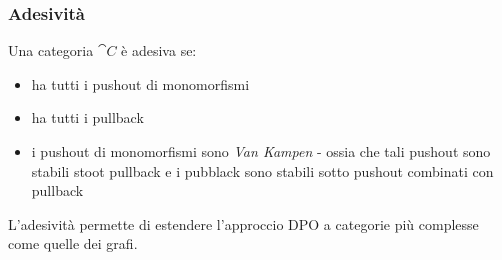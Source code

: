 \documentclass[8pt]{beamer}
\begin{document}
\begin{frame}[fragile]\frametitle{Adesività}


	\iffalse
	\begin{wrapfigure}{l}{0.4\textwidth}
                \[
                \begin{tikzcd}[row sep=11, column sep=11]
                        & {A'} && {B'} \\
                        {C'} && {D'} \\
                        & A && B \\
                        C && D
                        \arrow["{f'}", from=1-2, to=1-4]
                        \arrow["{m'}"', from=1-2, to=2-1]
                        \arrow["a"'{pos=0.7}, from=1-2, to=3-2]
                        \arrow["{n'}"', from=1-4, to=2-3]
                        \arrow["b", from=1-4, to=3-4]
                        \arrow["{g'}"{pos=0.7}, from=2-1, to=2-3, crossing over]
                        \arrow["c"', from=2-1, to=4-1]
                        \arrow["f"'{pos=0.3}, from=3-2, to=3-4]
                        \arrow["d"{pos=0.3}, from=2-3, to=4-3, crossing over]
                        \arrow["m", from=3-2, to=4-1]
                        \arrow["n", from=3-4, to=4-3]
                        \arrow["g"', from=4-1, to=4-3]
                    \end{tikzcd}
            \]
        \end{wrapfigure}
	\fi

	Una categoria $\cat C$ è adesiva se:
	\begin{itemize}
		\item ha tutti i pushout di monomorfismi
		\item ha tutti i pullback
		\item i pushout di monomorfismi sono \emph{Van Kampen} - ossia che tali pushout sono stabili stoot pullback e i pubblack sono stabili sotto pushout combinati con pullback
	\end{itemize}

	\smallskip

	L'adesività permette di estendere l'approccio DPO a categorie più complesse come quelle dei grafi.

	\smallskip
	
	\smallskip
\begin{figure}%
    \centering
    \qquad
    \label{fig:example}%
\end{figure}

\end{frame}
\end{document}

